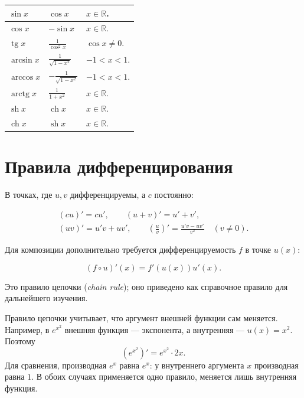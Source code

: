 \begin{longtable}{|p{.25\linewidth}|p{.29\linewidth}|p{.36\linewidth}|}
\(\displaystyle \sin x\)&\(\displaystyle \cos x\)&\(x\in\mathbb R\).\\[3pt]\hline

\(\displaystyle \cos x\)&\(\displaystyle -\sin x\)&\(x\in\mathbb R\).\\[3pt]\hline

\(\displaystyle \operatorname{tg}x\)&\(\displaystyle \frac1{\cos^2x}\)&\(\cos x\ne0\).\\[3pt]\hline

\(\displaystyle \arcsin x\)&\(\displaystyle \frac1{\sqrt{1-x^2}}\)&\(-1<x<1\).\\[3pt]\hline

\(\displaystyle \arccos x\)&\(\displaystyle -\frac1{\sqrt{1-x^2}}\)&\(-1<x<1\).\\[3pt]\hline

\(\displaystyle \operatorname{arctg}x\)&\(\displaystyle \frac1{1+x^2}\)&\(x\in\mathbb R\).\\[3pt]\hline

\(\displaystyle \operatorname{sh}x\)&\(\displaystyle \operatorname{ch}x\)&\(x\in\mathbb R\).\\[3pt]\hline

\(\displaystyle \operatorname{ch}x\)&\(\displaystyle \operatorname{sh}x\)&\(x\in\mathbb R\).\\[3pt]\hline

\end{longtable}\endgroup

\section*{Правила дифференцирования}

В точках, где \(u,v\) дифференцируемы, а \(c\) постоянно:

\[\begin{gathered}(cu)'=cu',\qquad (u+v)'=u'+v',\\(uv)'=u' v+uv',\qquad \left(\frac uv\right)'=\frac{u' v-uv'}{v^2}\quad(v\ne0).\end{gathered}\]

Для композиции дополнительно требуется дифференцируемость \(f\) в точке \(u(x)\):

\[(f\circ u)'(x)=f'(u(x))u'(x).\]

Это правило цепочки (\emph{chain rule}); оно приведено как справочное правило для дальнейшего изучения.

Правило цепочки учитывает, что аргумент внешней функции сам меняется. Например, в \(e^{x^2}\) внешняя функция — экспонента, а внутренняя — \(u(x)=x^2\). Поэтому
\[
\left(e^{x^2}\right)'=e^{x^2}\cdot2x.
\]
Для сравнения, производная \(e^x\) равна \(e^x\): у внутреннего аргумента \(x\) производная равна \(1\). В обоих случаях применяется одно правило, меняется лишь внутренняя функция.

